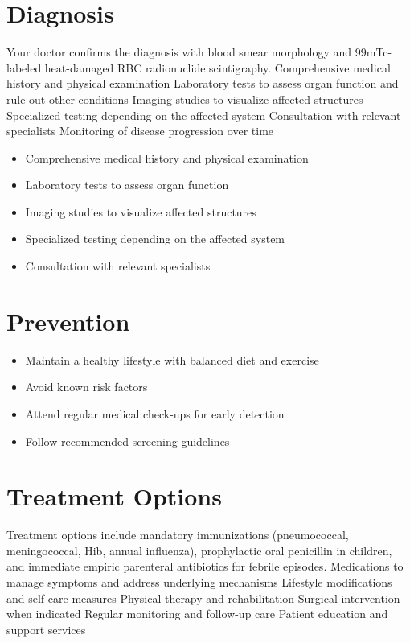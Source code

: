 \section{Diagnosis}
Your doctor confirms the diagnosis with blood smear morphology and 99mTc-labeled heat-damaged RBC radionuclide scintigraphy. Comprehensive medical history and physical examination Laboratory tests to assess organ function and rule out other conditions Imaging studies to visualize affected structures Specialized testing depending on the affected system Consultation with relevant specialists Monitoring of disease progression over time

\begin{itemize}[noitemsep]
  \item Comprehensive medical history and physical examination
  \item Laboratory tests to assess organ function
  \item Imaging studies to visualize affected structures
  \item Specialized testing depending on the affected system
  \item Consultation with relevant specialists
\end{itemize}
\section{Prevention}
\begin{itemize}[noitemsep]
  \item Maintain a healthy lifestyle with balanced diet and exercise
  \item Avoid known risk factors
  \item Attend regular medical check-ups for early detection
  \item Follow recommended screening guidelines
\end{itemize}
\section{Treatment Options}
Treatment options include mandatory immunizations (pneumococcal, meningococcal, Hib, annual influenza), prophylactic oral penicillin in children, and immediate empiric parenteral antibiotics for febrile episodes. Medications to manage symptoms and address underlying mechanisms Lifestyle modifications and self-care measures Physical therapy and rehabilitation Surgical intervention when indicated Regular monitoring and follow-up care Patient education and support services

